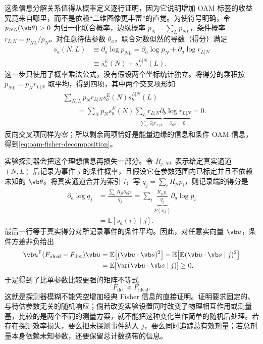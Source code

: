 这条信息分解关系值得从概率定义逐行证明，因为它说明增加 OAM 标签的收益究竟来自哪里，而不是依赖“二维图像更丰富”的直觉。为使符号明确，令 $p_{NL}(\vb\theta)>0$ 为归一化联合概率，边缘概率
$p_N=\sum_Lp_{NL}$，条件概率 $r_{L|N}=p_{NL}/p_N$。对任意待估参数 $\theta_a$，联合对数似然的导数（得分）满足
\begin{align*}
 s_a(N,L)&\equiv\partial_a\log p_{NL}
 =\partial_a\log p_N+\partial_a\log r_{L|N}\\
 &\equiv s_a^E(N)+s_a^{L|N}(L).
\end{align*}
这一步只使用了概率乘法公式，没有假设两个坐标统计独立。将得分的乘积按 $p_{NL}=p_Nr_{L|N}$ 取平均，得到四项，其中两个交叉项形如
\begin{align*}
 &\sum_{N,L}p_Nr_{L|N}s_a^E(N)s_b^{L|N}(L)\\
 &\qquad=\sum_Np_Ns_a^E(N)
   \underbrace{\sum_Lr_{L|N}\partial_b\log r_{L|N}}_{\displaystyle
   \sum_L\partial_b r_{L|N}=\partial_b1=0}=0.
\end{align*}
反向交叉项同样为零；所以剩余两项恰好是能量边缘的信息和条件 OAM 信息，得到\cref{eq:oam-fisher-decomposition}。

实验探测器会把这个理想信息再损失一部分。令 $R_{j,NL}$ 表示给定真实通道 $(N,L)$ 后记录为事件 $j$ 的条件概率，且假设它在参数范围内已标定并且不依赖未知的 $\vb\theta$。将真实通道合并为索引 $i$，写 $q_j=\sum_iR_{ji}p_i$，则记录端的得分是
\begin{align*}
 \partial_a\log q_j
 &=\frac{\sum_iR_{ji}\partial_a p_i}{q_j}
 =\sum_i\underbrace{\frac{R_{ji}p_i}{q_j}}_{P(i|j)}
 \partial_a\log p_i\\
 &=\mathbb E[s_a(i)\mid j].
\end{align*}
最后一行等于真实得分对所记录事件的条件平均。因此，对任意实向量 $\vb u$，条件方差非负给出
\begin{align*}
 \vb u^{\mathsf T}(F_{\mathrm{ideal}}-F_{\mathrm{det}})\vb u
 &=\mathbb E\!\left[(\vb u\cdot\vb s)^2\right]
 -\mathbb E\!\left[
   \mathbb E(\vb u\cdot\vb s\mid j)^2\right]\\
 &=\mathbb E\!\left[\operatorname{Var}(\vb u\cdot\vb s\mid j)\right]
 \ge0.
\end{align*}
于是得到了比单参数比较更强的矩阵不等式
\begin{equation}
 F_{\mathrm{det}}\preceq F_{\mathrm{ideal}}.
 \label{eq:detector-fisher-contract}
\end{equation}
这就是探测器模糊不能凭空增加经典 Fisher 信息的直接证明。证明要求固定的、与待估参数无关的随机响应；倘若改变实验设置同时改变了物理相互作用或测量基，比较的是两个不同的测量方案，就不能把这种变化当作简单的随机后处理。若存在探测效率损失，要么把未探测事件纳入 $j$，要么同时追踪总有效剂量；若总剂量本身依赖未知参数，还要保留总计数携带的信息。

